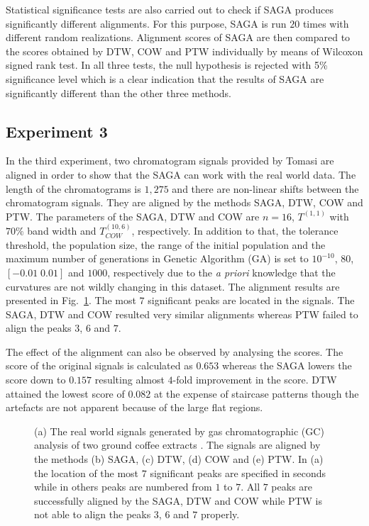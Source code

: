 \documentclass[number,1p,12pt]{elsarticle}
\begin{document}
Statistical significance tests are also carried out to check if SAGA produces significantly different alignments. For this purpose, SAGA is run $20$ times with different random realizations. Alignment scores of SAGA are then compared to the scores obtained by DTW, COW and PTW individually by means of Wilcoxon signed rank test. In all three tests, the null hypothesis is rejected with 5\% significance level which is a clear indication that the results of SAGA are significantly different than the other three methods. 

\subsection{Experiment 3}
In the third experiment, two chromatogram signals provided by Tomasi \cite{Tomasi2004} are aligned in order to show that the SAGA can work with the real world data. The length of the chromatograms is $1,275$ and there are non-linear shifts between the chromatogram signals. They are aligned by the methods SAGA, DTW, COW and PTW. The parameters of the SAGA, DTW and COW are $n=16$,  $T^{(1,1)}$ with $70\%$ band width and  $T_{COW}^{(10,6)}$, respectively. In addition to that, the tolerance threshold, the population size, the range of the initial population and the maximum number of generations in Genetic Algorithm (GA) is set to $10^{-10}$, $80$, $[-0.01\;0.01]$ and $1000$, respectively due to the {\it a priori}  knowledge that the curvatures are not wildly changing in this dataset. The alignment results are presented in Fig.~\ref{Figure08}. The most $7$ significant peaks are located in the signals. The SAGA, DTW and COW resulted very similar alignments whereas PTW failed to align the peaks $3$, $6$ and $7$. 

The effect of the alignment can also be observed by analysing the scores. The score of the original signals is calculated as $0.653$ whereas the SAGA lowers the score down to $0.157$ resulting almost $4$-fold improvement in the score. DTW attained the lowest score of $0.082$ at the expense of staircase patterns though the artefacts are not apparent because of the large flat regions.

\begin{figure}
\caption{(a) The real world signals generated by gas chromatographic (GC) analysis of  two ground coffee extracts \cite{Tomasi2004}. The signals are aligned by the methods (b) SAGA, (c) DTW, (d) COW and (e) PTW. In (a) the location of the most $7$ significant peaks are specified in seconds while in others peaks are numbered from $1$ to $7$. All $7$ peaks are successfully aligned by the SAGA, DTW and COW while PTW is not able to align the peaks $3$, $6$ and $7$ properly. }
\label{Figure08}
\end{figure} 
\end{document}
